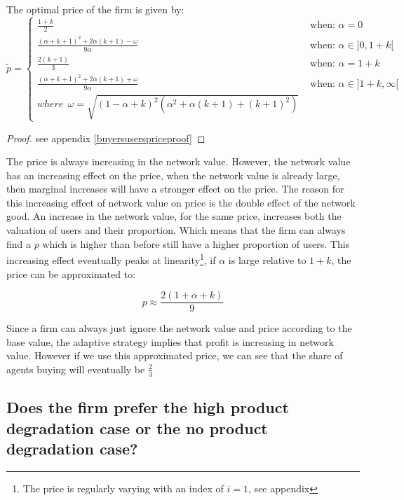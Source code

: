 \begin{proposition}
\label{buyersusersprice}

The optimal price of the firm is given by:
\[
\tilde{p}= \left\{
                \begin{array}{ll}
\frac{1+k}{2} ~~~~~~~~~~~~~~~~~~~~~~~~~~~~~~~~~~~~~~~~~~~~~~~~~~~~~~~~~~
&\text{ when: } \alpha = 0
\\
\frac{(\alpha+k+1)^2+2\alpha(k+1) - \omega}{9 \alpha} &\text{ when: } \alpha \in ]0,1+k[
\\
\frac{2(k+1)}{3 }~~~&\text{ when: } \alpha =1+k
                  \\
\frac{(\alpha+k+1)^2+2\alpha(k+1) + \omega}{9 \alpha} &\text{ when: } \alpha \in ]1+k,\infty [ \\
where ~~ \omega = \sqrt{(1-\alpha+k)^2(\alpha^2+\alpha (k+1)+(k+1)^2)} &
 \end{array}
 \right.
\]
\end{proposition}

\begin{proof}
see appendix \ref{buyersuserspriceproof}
\end{proof}

The price is always increasing in the network value. However, the network value has an increasing effect on the price, when the network value is already large, then marginal increases will have a stronger effect on the price. The reason for this increasing effect of network value on price is the double effect of the network good. An increase in the network value, for the same price, increases both the valuation of users and their proportion. Which means that the firm can always find a $p$ which is higher than before still have a higher proportion of users. This increasing effect eventually peaks at linearity\footnote{The price is regularly varying with an index of $i=1$, see appendix}, if $\alpha$ is large relative to $1+k$, the price can be approximated to:

\begin{equation}
p \approx \frac{2(1+\alpha+k)}{9}
\end{equation}


Since a firm can always just ignore the network value and price according to the base value, the adaptive strategy implies that profit is increasing in network value. However if we use this approximated price, we can see that the share of agents buying will eventually be $\frac{2}{3}$

\subsection{Does the firm prefer the high product degradation case or the no product degradation case? }


